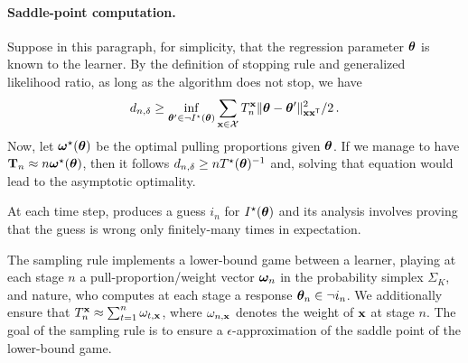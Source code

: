 \paragraph{Saddle-point computation.}
Suppose in this paragraph, for simplicity, that the regression parameter ${\boldsymbol \theta}$ is known to the learner. By the definition of stopping rule and generalized likelihood ratio, as long as the algorithm does not stop, we have
\begin{align*}
    d_{n,\delta} \ge \inf_{{\boldsymbol \theta}'\in \neg I^\star({\boldsymbol \theta})} \sum_{{\bf x}\in \mathcal{X}} T_n^{\bf x} \Vert {\boldsymbol \theta} - {\boldsymbol \theta}' \Vert^2_{{\bf x}{\bf x}^\mathsf{\scriptscriptstyle T}}/2\,.
\end{align*}
Now, let ${\boldsymbol \omega}^\star({\boldsymbol \theta})$ be the optimal pulling proportions given ${\boldsymbol \theta}$. If we manage to have ${\bf T}_n \approx n{\boldsymbol \omega}^\star({\boldsymbol \theta})$, then it follows $d_{n,\delta} \ge n T^\star({\boldsymbol \theta})^{-1}$ and, solving that equation would lead to the asymptotic optimality.


At each time step, \LG{} produces a guess $i_n$ for $I^\star({\boldsymbol \theta})$ and its analysis involves proving that the guess is wrong only finitely-many times in expectation.

The sampling rule implements a lower-bound game between a learner, playing at each stage $n$ a pull-proportion/weight vector ${\boldsymbol \omega}_n$ in the probability simplex $\Sigma_K$, and nature, who computes at each stage a response ${\boldsymbol \theta}_n \in \neg i_n$. We additionally ensure that $T_n^{\bf x} \approx \sum_{t=1}^n \omega_{t,{\bf x}}$, where $\omega_{n,{\bf x}}$ denotes the weight of ${\bf x}$ at stage $n$. The goal of the sampling rule is to ensure a $\epsilon$-approximation of the saddle point of the lower-bound game.

